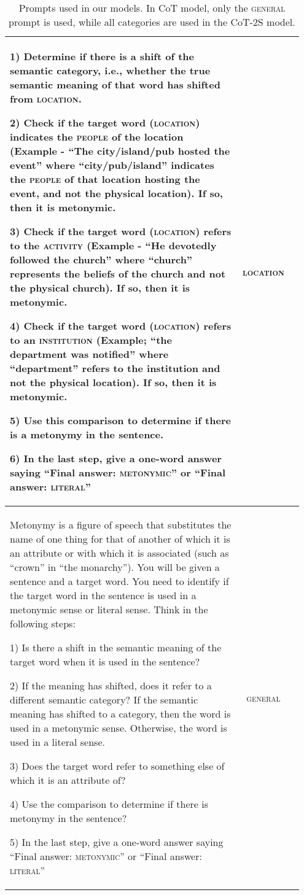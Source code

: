 \documentclass[11pt]{article}
\begin{document}
\begin{table*}[h]
{\begin{NiceTabular}{|p{0.95\linewidth}|c|l}
    1) Determine if there is a shift of the semantic category, i.e., whether the true semantic meaning of that word has shifted from \textsc{location}. 
    
    2) Check if the target word (\textsc{location}) indicates the \textsc{people} of the location (Example - ``The city/island/pub hosted the event'' where ``city/pub/island'' indicates the \textsc{people} of that location hosting the event, and not the physical location). If so, then it is metonymic. 
    
    3) Check if the target word (\textsc{location}) refers to the \textsc{activity} (Example - ``He devotedly followed the church'' where ``church'' represents the beliefs of the church and not the physical church). If so, then it is metonymic. 
    
    4) Check if the target word (\textsc{location}) refers to an \textsc{institution} (Example; ``the department was notified'' where ``department'' refers to the institution and not the physical location). If so, then it is metonymic. 
    
    5) Use this comparison to determine if there is a metonymy in the sentence. 
    
    6) In the last step, give a one-word answer saying ``Final answer: \textsc{metonymic}'' or ``Final answer: \textsc{literal}'' & \textsc{location} \\
    \midrule
    Metonymy is a figure of speech that substitutes the name of one thing for that of another of which it is an attribute or with which it is associated (such as ``crown'' in ``the monarchy''). You will be given a sentence and a target word. You need to identify if the target word in the sentence is used in a metonymic sense or literal sense. Think in the following steps: 
    
    1) Is there a shift in the semantic meaning of the target word when it is used in the sentence? 
    
    2) If the meaning has shifted, does it refer to a different semantic category? If the semantic meaning has shifted to a category, then the word is used in a metonymic sense. Otherwise, the word is used in a literal sense. 
    
    3) Does the target word refer to something else of which it is an attribute of? 
    
    4) Use the comparison to determine if there is metonymy in the sentence? 
    
    5) In the last step, give a one-word answer saying ``Final answer: \textsc{metonymic}'' or ``Final answer: \textsc{literal}''  & \textsc{general} \\
    \bottomrule
    
    \end{NiceTabular}
    }
    \caption{Prompts used in our models. In CoT model, only the \textsc{general} prompt is used, while all categories are used in the CoT-2S model.}
    \label{tab:all_prompts}
\end{table*}
\endgroup
\end{document}
